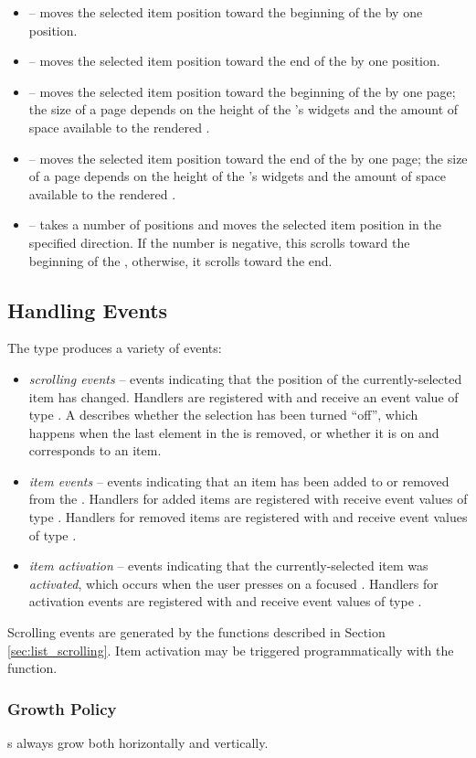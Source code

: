\begin{itemize}
\item {} -- moves the selected item position toward the
  beginning of the  by one position.
\item {} -- moves the selected item position toward the
  end of the  by one position.
\item {} -- moves the selected item position toward the
  beginning of the  by one page; the size of a page depends
  on the height of the 's widgets and the amount of space
  available to the rendered .
\item {} -- moves the selected item position toward the end
  of the  by one page; the size of a page depends on the
  height of the 's widgets and the amount of space available
  to the rendered .
\item {} -- takes a number of positions and moves the
  selected item position in the specified direction.  If the number is
  negative, this scrolls toward the beginning of the ,
  otherwise, it scrolls toward the end.
\end{itemize}

\subsection{Handling Events}

The  type produces a variety of events:

\begin{itemize}
\item \textit{scrolling events} -- events indicating that the position
  of the currently-selected item has changed.  Handlers are registered
  with  and receive an event value of type
  .  A  describes whether the
  selection has been turned ``off'', which happens when the last
  element in the  is removed, or whether it is on and
  corresponds to an item.
\item \textit{item events} -- events indicating that an item has been
  added to or removed from the .  Handlers for added items
  are registered with  receive event values of type
  .  Handlers for removed items are registered with
   and receive event values of type
  .
\item \textit{item activation} -- events indicating that the
  currently-selected item was \textit{activated}, which occurs when
  the user presses  on a focused .  Handlers for
  activation events are registered with  and
  receive event values of type .
\end{itemize}

Scrolling events are generated by the functions described in Section
\ref{sec:list_scrolling}.  Item activation may be triggered
programmatically with the  function.

\subsubsection{Growth Policy}

s always grow both horizontally and vertically.
